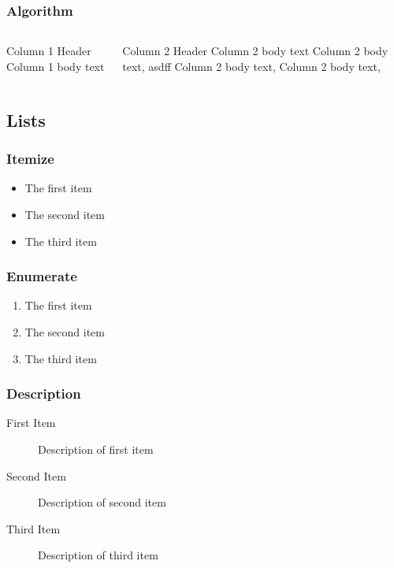 \documentclass[12pt]{beamer}
\begin{document}

\begin{frame}
  \frametitle{Algorithm}
  \begin{columns}
    \begin{block}{Column 1 Header}
      Column 1 body text
    \end{block}
    \pause

    \begin{block}{Column 2 Header}
      Column 2 body text Column 2 body text, asdff
      Column 2 body text, Column 2 body text, 
    \end{block}
  \end{columns}

\end{frame}


\subsection{Lists}
\begin{frame}
  \frametitle{Itemize}
  \begin{itemize}
    \item The first item
    \item The second item
    \item The third item
  \end{itemize}
\end{frame}

\begin{frame}
  \frametitle{Enumerate}
  \begin{enumerate}
  \item The first item
  \item The second item
  \item The third item
  \end{enumerate}
\end{frame}

\begin{frame}
  \frametitle{Description}
  \transboxin
  \begin{description}
  \item[First Item] Description of first item
  \item[Second Item] Description of second item
  \item[Third Item] Description of third item
  \end{description}
\end{frame}
\end{document}
